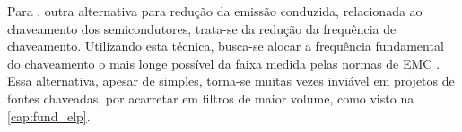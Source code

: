             Para , outra alternativa para redução da emissão conduzida, relacionada ao chaveamento dos semicondutores, trata-se da redução da frequência de chaveamento. Utilizando esta técnica, busca-se alocar a frequência fundamental do chaveamento o mais longe possível da faixa medida pelas normas de EMC \cite{ref:EMC_artigo_schlichting}. Essa alternativa, apesar de simples, torna-se muitas vezes inviável em projetos de fontes chaveadas, por acarretar em filtros de maior volume, como visto na \autoref{cap:fund_elp}.
            
            

